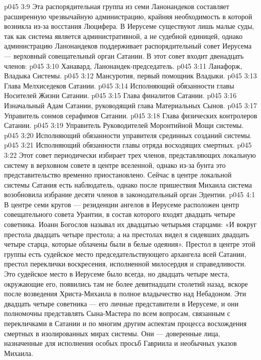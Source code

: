 \vs p045 3:9 \pc Эта распорядительная группа из семи Ланонандеков составляет расширенную чрезвычайную администрацию, крайняя необходимость в которой возникла из\hyp{}за восстания Люцифера. В Иерусеме существуют лишь малые суды, так как система является административной, а не судебной единицей, однако администрацию Ланонандеков поддерживает распорядительный совет Иерусема --- верховный совещательный орган Сатании. В этот совет входит двенадцать членов:
\vs p045 3:10 \bibnobreakspace Ханавард, Ланонандек\hyp{}председатель.
\vs p045 3:11 \bibnobreakspace Ланафорж, Владыка Системы.
\vs p045 3:12 \bibnobreakspace Мансуротия, первый помощник Владыки.
\vs p045 3:13 \bibnobreakspace Глава Мелхиседеков Сатании.
\vs p045 3:14 \bibnobreakspace Исполняющий обязанности главы Носителей Жизни Сатании.
\vs p045 3:15 \bibnobreakspace Глава финалитов Сатании.
\vs p045 3:16 \bibnobreakspace Изначальный Адам Сатании, руководящий глава Материальных Сынов.
\vs p045 3:17 \bibnobreakspace Управитель сонмов серафимов Сатании.
\vs p045 3:18 \bibnobreakspace Глава физических контролеров Сатании.
\vs p045 3:19 \bibnobreakspace Управитель Руководителей Моронтийной Мощи системы.
\vs p045 3:20 \bibnobreakspace Исполняющий обязанности управителя срединных созданий системы.
\vs p045 3:21 \bibnobreakspace Исполняющий обязанности главы отряда восходящих смертных.
\vs p045 3:22 \pc Этот совет периодически избирает трех членов, представляющих локальную систему в верховном совете в центре вселенной, однако из\hyp{}за бунта это представительство временно приостановлено. Сейчас в центре локальной системы Сатания есть наблюдатель, однако после пришествия Михаила система возобновила избрание десяти членов в законодательный орган Эдентии.
\vs p045 4:1 В центре семи кругов --- резиденции ангелов в Иерусеме расположен центр совещательного совета Урантии, в состав которого входят двадцать четыре советника. Иоанн Богослов называл их двадцатью четырьмя старцами: «И вокруг престола двадцать четыре престола; а на престолах видел я сидевших двадцать четыре старца, которые облачены были в белые одеяния». Престол в центре этой группы есть судейское место председательствующего архангела всей Сатании, престол переклички воскресения, исполненной милосердия и справедливости. Это судейское место в Иерусеме было всегда, но двадцать четыре места, окружающие его, появились там не более девятнадцати столетий назад, вскоре после возведения Христа\hyp{}Михаила в полное владычество над Небадоном. Эти двадцать четыре советника --- его личные представители в Иерусеме, и они полномочны представлять Сына\hyp{}Мастера по всем вопросам, связанным с перекличками в Сатании и по многим другим аспектам процесса восхождения смертных в изолированных мирах системы. Они --- доверенные лица, назначенные для исполнения особых просьб Гавриила и необычных указов Михаила.
